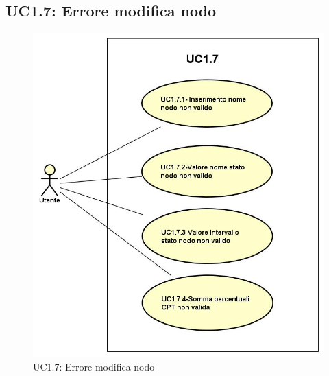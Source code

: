 \subsection{UC1.7: Errore modifica nodo}
\hypertarget{UC1.7}{} 
\begin{figure} [H]
	\centering
	\includegraphics[scale=0.45]{Img/UC1-7} 
	\caption{UC1.7: Errore modifica nodo} \label{} 
\end{figure}
